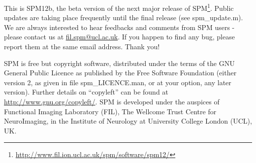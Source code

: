 \documentclass[a4paper,titlepage,openany]{article}
\begin{document}
\let\oldlabel=\label
\renewcommand{\label}[1]{
{\pdfdest name {#1} fit}
\oldlabel{#1}
}

\newlength{\centeroffset}
\setlength{\centeroffset}{-0.5\oddsidemargin}
\addtolength{\centeroffset}{0.5\evensidemargin}
\thispagestyle{empty}
\noindent\hspace*{\centeroffset}

\noindent\hspace*{\centeroffset}

\vspace{10mm}

This is SPM12b, the beta version of the next major release of SPM\footnote{\url{http://www.fil.ion.ucl.ac.uk/spm/software/spm12/}}. 
Public updates are taking place frequently until the final release (see spm\_update.m). 
We are always interested to hear feedbacks and comments from SPM users - please contact us at \href{mailto:fil.spm@ucl.ac.uk}{fil.spm@ucl.ac.uk}. 
If you happen to find any bug, please report them at the same email address. Thank you! 


SPM is free but copyright software, distributed under the terms of the GNU General Public Licence as published by the Free Software Foundation (either version 2, as given in file spm\_LICENCE.man, or at your option, any later version). Further details on ``copyleft'' can be found at \url{http://www.gnu.org/copyleft/}. 
SPM is developed under the auspices of Functional Imaging Laboratory (FIL), The Wellcome Trust Centre for NeuroImaging, in the Institute of Neurology at University College London (UCL), UK.
 
\end{document}
